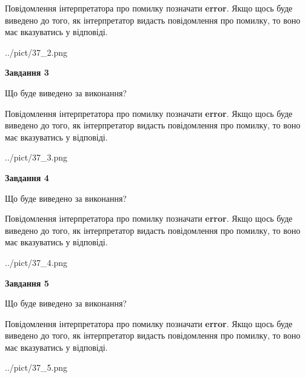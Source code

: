 \documentclass[12pt, ukrainian]{article}
\begin{document}
{\begin {large}
Повідомлення інтерпретатора про помилку позначати \textbf{error}.
Якщо щось буде виведено до того, як інтерпретатор видасть повідомлення про помилку, 
то воно має вказуватись у відповіді. \par


\begin{center}
	{../pict/37_2.png}
\end{center}
\newpage

{\begin {center}\textbf{Завдання 3}\end {center}}\par
Що буде виведено за виконання?

Повідомлення інтерпретатора про помилку позначати \textbf{error}.
Якщо щось буде виведено до того, як інтерпретатор видасть повідомлення про помилку, 
то воно має вказуватись у відповіді. \par


\begin{center}
	{../pict/37_3.png}
\end{center}
\newpage

{\begin {center}\textbf{Завдання 4}\end {center}}\par
Що буде виведено за виконання?

Повідомлення інтерпретатора про помилку позначати \textbf{error}.
Якщо щось буде виведено до того, як інтерпретатор видасть повідомлення про помилку, 
то воно має вказуватись у відповіді. \par


\begin{center}
	{../pict/37_4.png}
\end{center}
\newpage

{\begin {center}\textbf{Завдання 5}\end {center}}\par
Що буде виведено за виконання?

Повідомлення інтерпретатора про помилку позначати \textbf{error}.
Якщо щось буде виведено до того, як інтерпретатор видасть повідомлення про помилку, 
то воно має вказуватись у відповіді. \par


\begin{center}
	{../pict/37_5.png}
\end{center}
\newpage


\end{large}}
\end{document}
